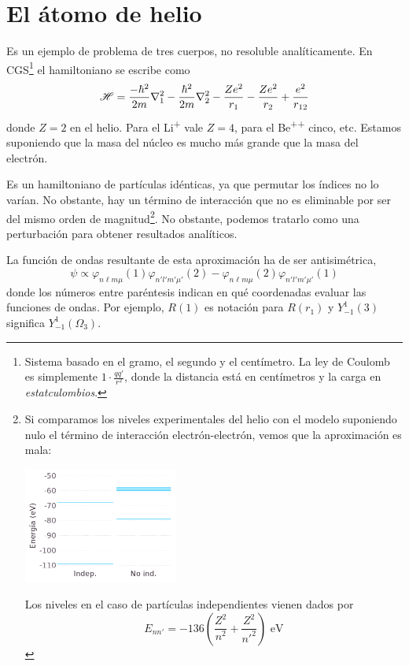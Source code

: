 \chapter{El átomo de helio}
Es un ejemplo de problema de tres cuerpos, no resoluble
analíticamente. En CGS\footnote{Sistema basado en el gramo, el segundo
y el centímetro. La ley de Coulomb es simplemente $1\cdot\frac{qq'}{r^2}$,
donde la distancia está en centímetros y la carga en \emph{estatculombios}.} el hamiltoniano se escribe como
\begin{equation}
   \mathscr{H}  = \frac{-\hbar^2}{2m} \nabla_1^2 - \frac{\hbar^2}{2m}
  \nabla_2^2 - \frac{Ze^2}{r_1} - \frac{Ze^2}{r_2} + \frac{e^2}{r_{12}}
  \label{eq:heliumh}
\end{equation}
donde $Z=2$ en el helio. Para el Li\textsuperscript{+} vale $Z=4$,
para el Be\textsuperscript{++} cinco, etc. Estamos suponiendo que la
masa del núcleo es mucho más grande que la masa del electrón.

Es un hamiltoniano de partículas idénticas, ya que permutar los
índices no lo varían. No obstante, hay un término de interacción que
no es eliminable por ser del mismo orden de magnitud\footnote{
Si comparamos los niveles experimentales del helio con el
    modelo suponiendo nulo el término de interacción
    electrón-electrón, vemos que la aproximación es mala:
    \begin{center}
      \includegraphics[width=0.4\textwidth]{figures/helium_noint.png}
    \end{center}
Los niveles en el caso de partículas independientes vienen dados
por \[E_{nn'} = -136 \left( \frac{Z^2}{n^2} + \frac{Z^2}{n'^2}
  \right) \text{ eV}\]
}. No obstante, podemos tratarlo como una perturbación para obtener
resultados analíticos.

La función de ondas resultante de esta aproximación ha de ser antisimétrica,
\begin{equation}
  \psi \propto \varphi_{n\ell m\mu}(1)\varphi_{n'l'm'\mu'}(2) - \varphi_{n\ell m\mu}(2)\varphi_{n'l'm'\mu'}(1)
\end{equation}
donde los números entre paréntesis indican en qué coordenadas evaluar las
funciones de ondas. Por ejemplo, $R(1)$ es notación para $R(r_1)$ y
$Y_{-1}^{1}(3)$ significa $Y_{-1}^1 (\Omega_3)$.


